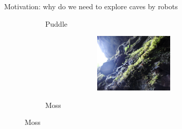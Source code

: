\documentclass[aspectratio=169,xcolor=table]{beamer}
\begin{document}
\begin{frame}[t]{Motivation: why do we need to explore caves by robots}
\begin{figure}[H]
\begin{subfigure}[b]{0.3\textwidth}
            \caption*{Puddle}
            \label{fig:surface_types/splash.png}
        \end{subfigure}
        \hfill
        \begin{subfigure}[b]{0.3\textwidth}
            \centering\includegraphics[height=2.8cm,width=1\textwidth,keepaspectratio]{surface_types/moss.jpg}\\
            \caption*{Moss}
            \label{fig:surface_types/moss}
        \end{subfigure}
    \end{figure}
\end{frame}
\end{document}
